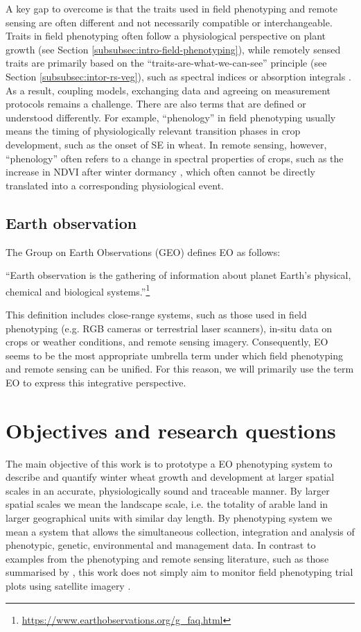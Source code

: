 A key gap to overcome is that the traits used in field phenotyping and remote sensing are often different and not necessarily compatible or interchangeable. Traits in field phenotyping often follow a physiological perspective on plant growth (see Section \ref{subsubsec:intro-field-phenotyping}), while remotely sensed traits are primarily based on the ``traits-are-what-we-can-see'' principle (see Section \ref{subsubsec:intor-rs-veg}), such as spectral indices \cite{bannari_review_1995} or absorption integrals \citep[for example]{wocher_rtm-based_2020}. As a result, coupling models, exchanging data and agreeing on measurement protocols remains a challenge. There are also terms that are defined or understood differently. For example, ``phenology'' in field phenotyping usually means the timing of physiologically relevant transition phases in crop development, such as the onset of \gls{SE} in wheat. In remote sensing, however, ``phenology'' often refers to a change in spectral properties of crops, such as the increase in \gls{NDVI} after winter dormancy \citep{de_beurs_land_2004}, which often cannot be directly translated into a corresponding physiological event.

\subsection{Earth observation}
\label{subsubsec:intro-eo}
The Group on Earth Observations (GEO) defines \gls{EO} as follows:
\begin{displayquote}
``Earth observation is the gathering of information about planet Earth's physical, chemical and biological systems.''\footnote{\url{https://www.earthobservations.org/g_faq.html}}
\end{displayquote}
This definition includes close-range systems, such as those used in field phenotyping (e.g. RGB cameras or terrestrial laser scanners), in-situ data on crops or weather conditions, and remote sensing imagery.
Consequently, \gls{EO} seems to be the most appropriate umbrella term under which field phenotyping and remote sensing can be unified. For this reason, we will primarily use the term \gls{EO} to express this integrative perspective.

\section{Objectives and research questions}
\label{sec:intro-obj-rj}
The main objective of this work is to prototype a \gls{EO} phenotyping system to describe and quantify winter wheat growth and development at larger spatial scales in an accurate, physiologically sound and traceable manner. By larger spatial scales we mean the landscape scale, i.e. the totality of arable land in larger geographical units with similar day length. By phenotyping system we mean a system that allows the simultaneous collection, integration and analysis of phenotypic, genetic, environmental and management data. In contrast to examples from the phenotyping and remote sensing literature, such as those summarised by \cite{zhang_high-resolution_2020}, this work does not simply aim to monitor field phenotyping trial plots using satellite imagery \citep{pinto_satellite_2023}.

